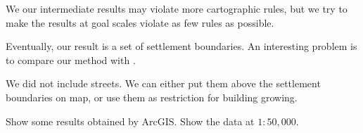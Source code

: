 \documentclass[graybox]{svmult}
\begin{document}
We our intermediate results may violate more cartographic rules, but we try to 
make the results at goal scales violate as few rules as possible.


Eventually, our result is a set of settlement boundaries. An interesting 
problem is to compare our method with \textcite{Chaudhry2008}.

We did not include streets. We can either put them above the settlement 
boundaries on map, or use them as restriction for building growing.

Show some results obtained by ArcGIS.
Show the data at $1:50{,}000$.


\printbibliography
\end{document}

